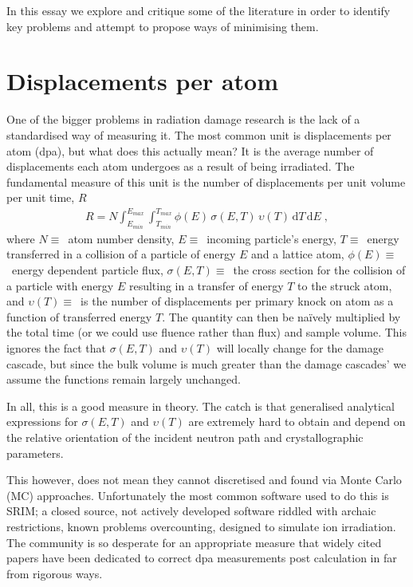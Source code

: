\documentclass[12pt, a4paper]{article}
\begin{document}
		In this essay we explore and critique some of the literature in order to identify key problems and attempt to propose ways of minimising them.
	\section{Displacements per atom}\label{s:dpa}
		One of the bigger problems in radiation damage research is the lack of a standardised way of measuring it. The most common unit is displacements per atom (dpa), but what does this actually mean? It is the average number of displacements each atom undergoes as a result of being irradiated. The fundamental measure of this unit is the number of displacements per unit volume per unit time, $R$
		\begin{align}
			R=N\int _{E_{min}}^{E_{max}}\int _{T_{min}}^{T_{max}}\phi (E)\,\sigma (E,T)\,\upsilon (T)\,\mathrm{d}T\,\mathrm{d}E\;,
		\end{align}
		where $N \equiv$~atom number density, $E \equiv$~incoming particle's energy, $T \equiv$~energy transferred in a collision of a particle of energy $E$ and a lattice atom, $\phi (E) \equiv$~energy dependent particle flux, $\sigma (E,T) \equiv$~the cross section for the collision of a particle with energy $E$ resulting in a transfer of energy $T$ to the struck atom, and $\upsilon (T) \equiv$~is the number of displacements per primary knock on atom as a function of transferred energy $T$. The quantity can then be na\"{i}vely multiplied by the total time (or we could use fluence rather than flux) and sample volume. This ignores the fact that $\sigma (E,T)$ and $\upsilon (T)$ will locally change for the damage cascade, but since the bulk volume is much greater than the damage cascades' we assume the functions remain largely unchanged.
		
		In all, this is a good measure in theory. The catch is that generalised analytical expressions for $\sigma (E,T)$ and $\upsilon (T)$ are extremely hard to obtain and depend on the relative orientation of the incident neutron path and crystallographic parameters.
		
		This however, does not mean they cannot discretised and found via Monte Carlo (MC) approaches. Unfortunately the most common software used to do this is SRIM; a closed source, not actively developed software riddled with archaic restrictions, known problems overcounting, designed to simulate ion irradiation. The community is so desperate for an appropriate measure that widely cited papers have been dedicated to correct dpa measurements post calculation in far from rigorous ways.
		
\end{document}

